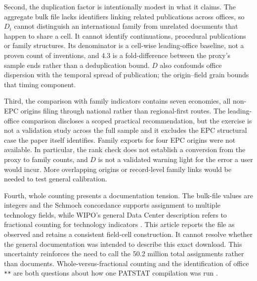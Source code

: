\documentclass[a4paper,fleqn]{cas-dc}
\begin{document}
Second, the duplication factor is intentionally modest in what it claims.
The aggregate bulk file lacks identifiers linking related publications across
offices, so $D_i$ cannot distinguish an international family from unrelated
documents that happen to share a cell. It cannot identify continuations,
procedural publications or family structures. Its denominator is a cell-wise
leading-office baseline, not a proven count of inventions, and 4.3 is a
fold-difference between the proxy's sample ends rather than a deduplication
bound. $D$ also confounds office dispersion with the temporal spread of
publication; the origin--field grain bounds that timing component.

Third, the comparison with family indicators contains seven economies, all
non-EPC origins filing through national rather than regional-first routes.
The leading-office comparison discloses a scoped practical recommendation,
but the exercise is not a validation study across the full sample and it
excludes the EPC structural case the paper itself identifies. Family exports
for four EPC origins were not available. In particular, the rank check does
not establish a conversion from the proxy to family counts, and $D$ is not a
validated warning light for the error a user would incur. More overlapping
origins or record-level family links would be needed to test general
calibration.

Fourth, whole counting presents a documentation tension. The bulk-file values
are integers and the Schmoch concordance supports assignment to multiple
technology fields, while WIPO's general Data Center description refers to
fractional counting for technology indicators \citep{schmoch2008,wipoabout}.
This article reports the file as observed and retains a consistent
field-cell construction. It cannot resolve whether the general documentation
was intended to describe this exact download. This uncertainty reinforces the
need to call the 50.2 million total assignments rather than documents.
Whole-versus-fractional counting and the identification of office \texttt{**}
are both questions about how one PATSTAT compilation was run
\citep{wipoabout}.
\end{document}
